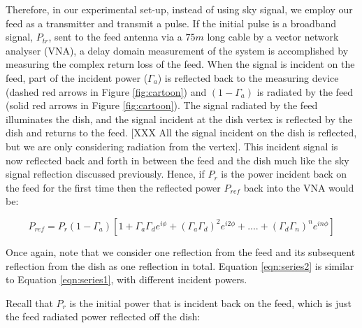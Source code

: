 \documentclass[12pt,preprint]{aastex}
\begin{document}

Therefore, in our experimental set-up, instead of using sky signal, we employ
our feed as a transmitter and transmit a pulse. If the initial pulse is a broadband signal,
$P_{tr}$, sent to the feed antenna via a $75m$ long cable by a vector network
analyser (VNA), a delay domain measurement of the system is accomplished by
measuring the complex return loss of the feed. When the signal is incident on
the feed, part of the incident power ($\Gamma_{a}$) is reflected back to the
measuring device (dashed red arrows in Figure \ref{fig:cartoon}) and
$(1-\Gamma_{a})$ is radiated by the feed (solid red arrows in Figure
\ref{fig:cartoon}). The signal radiated by the feed illuminates the dish, and
the signal incident at the dish vertex is reflected by the dish and returns to
the feed. [XXX All the signal incident on the dish is reflected, but we are
only considering radiation from the vertex]. This incident signal is now
reflected back and forth in between the feed and the dish much like the sky
signal reflection discussed previously.  Hence, if $P_{r}$ is the power
incident back on the feed for the first time then the reflected power $P_{ref}$
back into the VNA would be:

\begin{equation}\label{eqn:series2}
P_{ref} =  P_{r}(1-\Gamma_{a})[1+ \Gamma_{a}\Gamma_{d} e^{i\phi}+ (\Gamma_{a}\Gamma_{d})^2e^{i2\phi}+ ....+ (\Gamma_{d}\Gamma_{n})^{n}e^{in\phi}]
\end{equation}
 
Once again, note that we consider one reflection from the feed and its subsequent reflection from the dish as one reflection in total. Equation \ref{eqn:series2} is similar to Equation \ref{eqn:series1}, with different incident powers.

Recall that $P_{r}$ is the initial power that is incident back on the feed, which is just the feed radiated power reflected off the dish:
 
\end{document}
